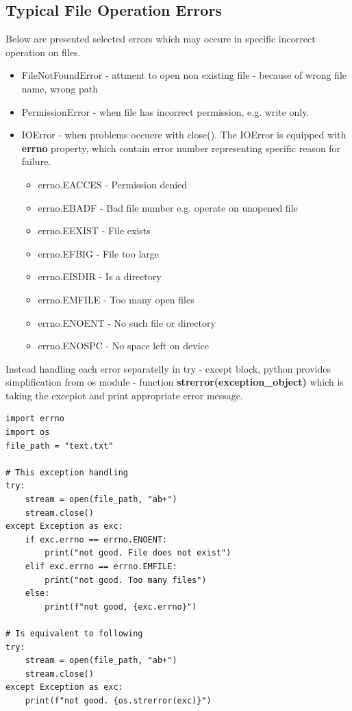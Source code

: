 \documentclass{article}
\begin{document}
\subsection{Typical File Operation Errors }
Below are presented selected errors which may occure in specific incorrect operation on files.
\begin{itemize}
\item \textcolor{pythonerror}{FileNotFoundError} - attment to open non existing file - because of wrong file name, wrong path
\item \textcolor{pythonerror}{PermissionError} - when file has incorrect permission, e.g. write only.
\item \textcolor{pythonerror}{IOError} - when problems occuere with close(). The IOError is equipped with \textbf{errno} property, which contain error number representing specific reason for failure.
\begin{itemize}
\item errno.EACCES - Permission denied
\item errno.EBADF - Bad file number e.g. operate on unopened file
\item errno.EEXIST - File exists
\item errno.EFBIG - File too large
\item errno.EISDIR - Is a directory
\item errno.EMFILE - Too many open files
\item errno.ENOENT - No such file or directory
\item errno.ENOSPC - No space left on device
\end{itemize}
\end{itemize}
Instead handling each error separatelly in try - except block, python provides simplification from os module - function \textbf{strerror(exception\_object)} which is taking the excepiot and print appropriate error message.
\begin{lstlisting}[style=pystyle]
import errno
import os
file_path = "text.txt"

# This exception handling
try:
    stream = open(file_path, "ab+")      
    stream.close()
except Exception as exc:
    if exc.errno == errno.ENOENT:
        print("not good. File does not exist")
    elif exc.errno == errno.EMFILE:
        print("not good. Too many files")
    else:
        print(f"not good, {exc.errno}")

# Is equivalent to following
try:
    stream = open(file_path, "ab+")      
    stream.close()
except Exception as exc:
    print(f"not good. {os.strerror(exc)}")
\end{lstlisting} 
\end{document}
